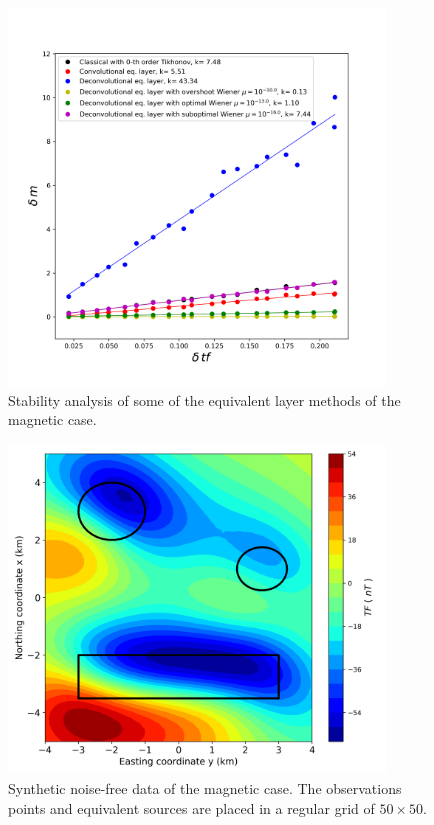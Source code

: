 \begin{figure}[htbp]
	\begin{center}
		\includegraphics[width=10cm]{Fig/stability_mag}
	\end{center}
	\caption{Stability analysis of some of the equivalent layer methods of the magnetic case.}
	\label{fig:6}
\end{figure}

\begin{figure}[htbp]
	\begin{center}
		\includegraphics[width=10cm]{Fig/synthetic_mag}
	\end{center}
	\caption{Synthetic noise-free data of the magnetic case. The observations points and equivalent sources are placed in a regular grid of $50 \times 50$.}
	\label{fig:7}
\end{figure}


